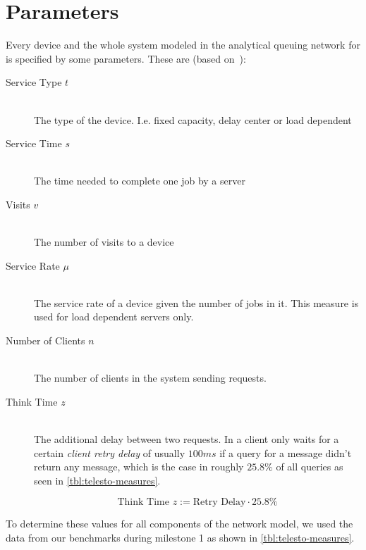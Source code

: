 \documentclass[a4paper, oneside]{csthesis}
\begin{document}
\section{Parameters}
    Every device and the whole system modeled in the analytical queuing network
    for \telesto{} is specified by some parameters. These are (based
    on~\cite{jain2008art}):
    
    \begin{description}
        \item[Service Type $t$] \ \\
            The type of the device. I.e. fixed capacity, delay center or load
            dependent
        \item[Service Time $s$] \ \\
            The time needed to complete one job by a server
        \item[Visits $v$] \ \\
            The number of visits to a device
        \item[Service Rate $\mu$] \ \\
            The service rate of a device given the number of jobs in it.
            This measure is used for load dependent servers only.
        \item[Number of Clients $n$] \ \\
            The number of clients in the system sending requests.
        \item[Think Time $z$] \ \\
            The additional delay between two requests. In \telesto{} a client
            only waits for a certain {\it client retry delay} of usually $100
            ms$ if a query for a message didn't return any message, which is
            the case in roughly $25.8 \%$ of all queries as seen in
            \cref{tbl:telesto-measures}.
            
            \[
                \text{Think Time } z := \text{Retry Delay} \cdot 25.8\%
            \]
            
    \end{description}


    To determine these values for all components of the network model, we used
    the data from our benchmarks during milestone 1 as shown in
    \cref{tbl:telesto-measures}.
\end{document}

